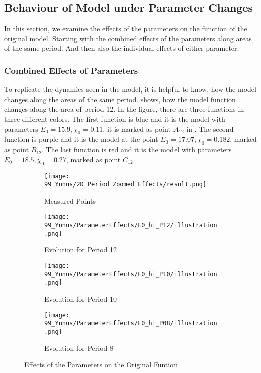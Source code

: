 \subsection{Behaviour of Model under Parameter Changes}
\label{sec:og.param.effects}

In this section, we examine the effects of the parameters on the function of the original model.
Starting with the combined effects of the parameters along areas of the same period.
And then also the individual effects of either parameter.

\subsubsection{Combined Effects of Parameters}

To replicate the dynamics seen in the model, it is helpful to know, how the model changes along the areas of the same period.
 shows, how the model function changes along the area of period 12.
In the figure, there are three functions in three different colors.
The first function is blue and it is the model with parameters $E_0 = 15.9, \chi_0 = 0.11$, it is marked as point $A_12$ in .
The second function is purple and it is the model at the point $E_0 = 17.07, \chi_0 = 0.182$, marked as point $B_{12}$.
The last function is red and it is the model with parameters $E_0 = 18.5, \chi_0 = 0.27$, marked as point $C_{12}$.

\begin{figure}
    \centering
    \begin{subfigure}{0.4\textwidth}
        \texttt{[image: 99\_Yunus/2D\_Period\_Zoomed\_Effects/result.png]}
        \caption{Measured Points}
        \label{fig:yunus.function.evolution.map}
    \end{subfigure}
    \begin{subfigure}{0.4\textwidth}
        \texttt{[image: 99\_Yunus/ParameterEffects/E0\_hi\_P12/illustration.png]}
        \caption{Evolution for Period 12}
        \label{fig:yunus.function.evolution.12}
    \end{subfigure}
    \begin{subfigure}{0.4\textwidth}
        \texttt{[image: 99\_Yunus/ParameterEffects/E0\_hi\_P10/illustration.png]}
        \caption{Evolution for Period 10}
        \label{fig:yunus.function.evolution.10}
    \end{subfigure}
    \begin{subfigure}{0.4\textwidth}
        \texttt{[image: 99\_Yunus/ParameterEffects/E0\_hi\_P08/illustration.png]}
        \caption{Evolution for Period 8}
        \label{fig:yunus.function.evolution.08}
    \end{subfigure}
    \caption{Effects of the Parameters on the Original Funtion}
\end{figure}

